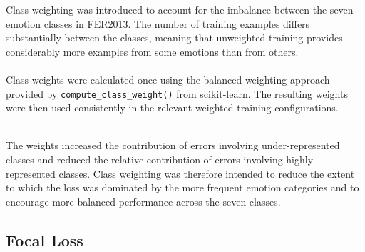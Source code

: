 \documentclass[12pt, a4paper]{report}
\let\oldsubsection\subsection
\renewcommand{\subsection}{%
    \Needspace{6\baselineskip}%
    \oldsubsection
}
\begin{document}
				Class weighting was introduced to account for the imbalance between the seven emotion classes in FER2013. The number of training examples differs substantially between the classes, meaning that unweighted training provides considerably more examples from some emotions than from others.\\\\
				Class weights were calculated once using the balanced weighting approach provided by \texttt{compute\_class\_weight()} from scikit-learn. The resulting weights were then used consistently in the relevant weighted training configurations.\\
				\begin{table}[h!]
					\centering
					\caption{Class Weights Used During Training}
					\label{tab:class_weights}
				\end{table}\\
				The weights increased the contribution of errors involving under-represented classes and reduced the relative contribution of errors involving highly represented classes. Class weighting was therefore intended to reduce the extent to which the loss was dominated by the more frequent emotion categories and to encourage more balanced performance across the seven classes.
				
			\subsection{Focal Loss}
				
\end{document}
